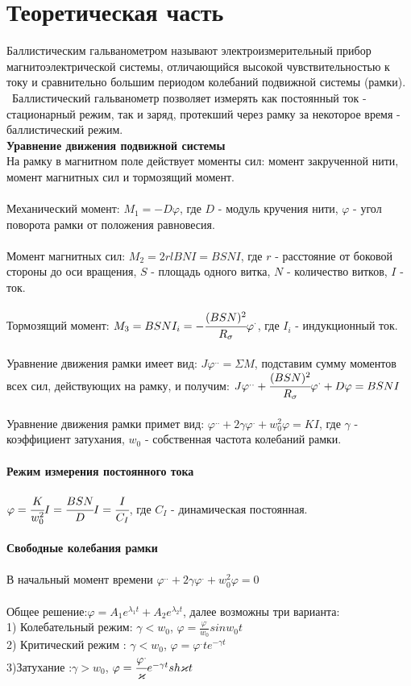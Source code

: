 \documentclass[11pt,a4paper]{article}
\begin{document}
\part*{Теоретическая часть}
Баллистическим гальванометром называют электроизмерительный прибор магнитоэлектрической системы, отличающийся высокой чувствительностью к току и сравнительно большим периодом колебаний подвижной системы (рамки). \\\
Баллистический гальванометр позволяет измерять как постоянный ток - стационарный режим, так и заряд, протекший через рамку за некоторое время - баллистический режим.\\
\textbf{Уравнение движения подвижной системы}\\
На рамку в магнитном поле действует моменты сил: момент закрученной нити, момент магнитных сил и тормозящий момент. 
\\
\\
Механический момент: $M_1 = -D\varphi$, где $D$ - модуль кручения нити, $\varphi$ - угол поворота рамки от положения равновесия.\\
\\
Момент магнитных сил: $M_2=2rlBNI=BSNI$, где $r$ - расстояние от боковой стороны до оси вращения, $S$ - площадь одного витка, $N$ - количество витков, $I$ - ток.\\
\\
Тормозящий момент: $M_3 = BSNI_i=- \cfrac{(BSN)^2}{R_\sigma}\varphi^\cdot$, где $I_i$ - индукционный ток.\\
\\
Уравнение движения рамки имеет вид: $J\varphi^{..} = \Sigma M$, подставим сумму моментов всех сил, действующих на рамку, и получим: $J\varphi^{..} + \cfrac{(BSN)^2}{R_\sigma}\varphi^\cdot + D\varphi = BSNI$\\
\\
Уравнение движения рамки примет вид: $\varphi^{..} + 2\gamma \varphi^{.} + w_0^2\varphi = KI$, где $\gamma$ - коэффициент затухания, $w_0$ - собственная частота колебаний рамки.\\
\\
\textbf{Режим измерения постоянного тока}\\
\\
$\varphi = \cfrac{K}{w_0^2}I = \cfrac{BSN}{D}I = \cfrac{I}{C_I}$, где $C_I$ - динамическая постоянная.\\
\\
\textbf{Свободные колебания рамки}\\
\\
В начальный момент времени $\varphi^{..} + 2\gamma \varphi^{.} + w_0^2\varphi = 0$\\
\\
Общее решение:$\varphi = A_1e^{\lambda_1t} + A_2e^{\lambda_2t}$, далее возможны три варианта: \\
1) Колебательный режим: $\gamma < w_0$, $\varphi = \frac{\varphi^{.}}{w_0} sin w_0t$\\
2) Критический режим : $\gamma < w_0$, $\varphi = \varphi^{.}te^{-\gamma t}$\\
3)Затухание :$\gamma > w_0$, $\varphi = \cfrac{\varphi ^.}{\varkappa}e^{ - \gamma t} sh \varkappa t$\\
\end{document}
